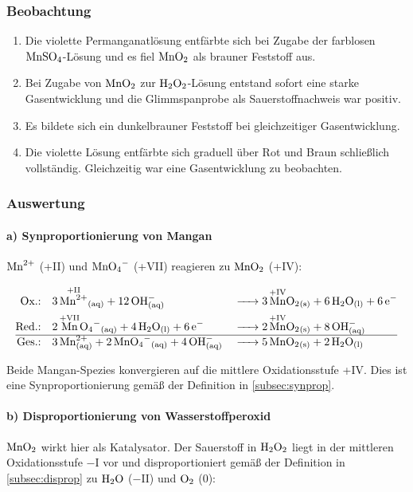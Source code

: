 \subsubsection{Beobachtung}
\begin{enumerate}[label=\textbf{\alph*)}]
    \item Die violette Permanganatlösung entfärbte sich bei Zugabe der farblosen $\ce{MnSO4}$-Lösung und es fiel $\ce{MnO2}$ als brauner Feststoff aus.
    \item Bei Zugabe von $\ce{MnO2}$ zur $\ce{H2O2}$-Lösung entstand sofort eine starke Gasentwicklung und die Glimmspanprobe als Sauerstoffnachweis war positiv.
    \item Es bildete sich ein dunkelbrauner Feststoff bei gleichzeitiger Gasentwicklung.
    \item Die violette Lösung entfärbte sich graduell über Rot und Braun schließlich vollständig. Gleichzeitig war eine Gasentwicklung zu beobachten.
\end{enumerate}

\subsubsection{Auswertung}
\paragraph{a) Synproportionierung von Mangan}
$\ce{Mn^{2+}}$ (+II) und $\ce{MnO4^-}$ (+VII) reagieren zu $\ce{MnO2}$ (+IV):

\begin{align}
    \text{Ox.:}\quad  &
    \ce{3 \overset{\mathrm{+II}}{\ce{Mn^{2+}}}_{(aq)} + 12 OH^-_{(aq)}}
                      &   & \ce{-> 3 \overset{\mathrm{+IV}}{\ce{Mn}}O2_{(s)} + 6 H2O_{(l)} + 6 e^-} \\
    \text{Red.:}\quad &
    \ce{2 \overset{\mathrm{+VII}}{\ce{Mn}}O4^-_{(aq)} + 4 H2O_{(l)} + 6 e^-}
                      &   & \ce{-> 2 \overset{\mathrm{+IV}}{\ce{Mn}}O2_{(s)} + 8 OH^-_{(aq)}}       \\
    \hline
    \text{Ges.:}\quad &
    \ce{3 Mn^{2+}_{(aq)} + 2 MnO4^-_{(aq)} + 4 OH^-_{(aq)}}
                      &   & \ce{-> 5 MnO2_{(s)} + 2 H2O_{(l)}}
\end{align}

Beide Mangan-Spezies konvergieren auf die mittlere Oxidationsstufe +IV. Dies ist eine Synproportionierung gemäß der Definition in \ref{subsec:synprop}.\cite{skript}

\paragraph{b) Disproportionierung von Wasserstoffperoxid}
$\ce{MnO2}$ wirkt hier als Katalysator. Der Sauerstoff in $\ce{H2O2}$ liegt in der mittleren Oxidationsstufe $-$I vor und disproportioniert gemäß der Definition in \ref{subsec:disprop} zu $\ce{H2O}$ ($-$II) und $\ce{O2}$ (0):

